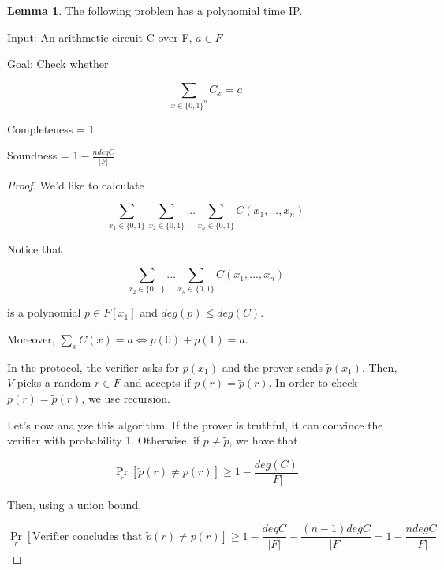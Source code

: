 \documentclass{article}
\theoremstyle{definition}
\newtheorem{lemma}[theorem]{Lemma}
\begin{document}
\begin{lemma}\label{evaluating_acs_in_ip}
    The following problem has a polynomial time IP.

    Input: An arithmetic circuit C over F, $a \in F$

    Goal: Check whether 

    \[ \sum_{x \in \{0,1\}^{n}} C_{x} = a\]

    Completeness =  1
    
    Soundness = $1 - \frac{n degC}{\lvert F \rvert}$
\end{lemma}
\begin{proof}
    We'd like to calculate
    
    \[ \sum_{x_{1} \in \{0,1\}} \sum_{x_{2} \in \{0,1\}} ... \sum_{x_{n} \in \{0,1\}} C(x_{1},...,x_{n})\]

    Notice that 

    \[ \sum_{x_{2} \in \{0,1\}} ... \sum_{x_{n} \in \{0,1\}} C(x_{1},...,x_{n})\]

    is a polynomial $p \in F[x_{1}]$ and $deg(p) \leq deg(C)$.

    Moreover, $\sum_{x} C(x) = a \iff p(0) + p(1) = a$.

    In the protocol, the verifier asks for $p(x_{1})$ and the prover sends $\tilde{p}(x_{1})$. Then, $V$ picks a random $r \in F$ and accepts if $p(r) = \tilde{p}(r)$. In order to check $p(r) = \tilde{p}(r)$, we use recursion.

    Let's now analyze this algorithm. If the prover is truthful, it can convince the verifier with probability 1. Otherwise, if $p \neq \tilde{p}$, we have that 

    \[ \Pr_{r}[\tilde{p}(r) \neq p(r)] \geq 1 - \frac{deg(C)}{\lvert F \rvert}\]

    Then, using a union bound,

    \[ \Pr_{r}[\text{Verifier concludes that $\tilde{p}(r) \neq p(r)$}] \geq 1 - \frac{degC}{\lvert F \rvert} - \frac{(n-1) degC}{\lvert F \rvert} = 1 - \frac{n degC}{\lvert F \rvert} \]
\end{proof}
\end{document}
